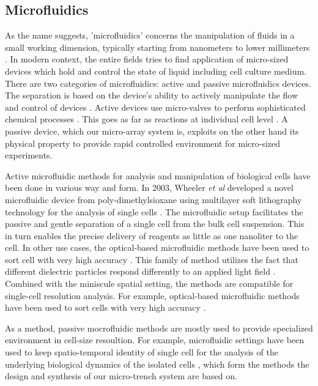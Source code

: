 \documentclass[pdftex,12pt,a4paper]{report}
\begin{document}
\subsection{Microfluidics}

As the name suggests, 'microfluidics' concerns the manipulation of fluids in a small working dimension, typically starting from nanometers to lower millimeters \cite{whitesides2006origins}. In modern context, the entire fields tries to find application of micro-sized devices which hold and control the state of liquid \cite{whitesides2006origins} including cell culture medium. There are two categories of microfluidics: active and passive microfluidics devices. The separation is based on the device's ability to actively manipulate the flow and control of devices \cite{sekhavati2015dynamic}. Active devices use micro-valves to perform sophisticated chemical processes \cite{marsden1993interdisciplinary}. This goes as far as reactions at individual cell level \cite{eyer2012microchamber}. A passive device, which our micro-array system is, exploits on the other hand its physical property to provide rapid controlled environment for micro-sized experiments.

Active microfluidic methods for analysis and manipulation of biological cells have been done in various way and form. In 2003, Wheeler \textit{et al} developed a novel microfluidic device from poly-dimethylsioxane using multilayer soft lithography technology for the analysis of single cells \cite{wheeler2003microfluidic}. The microfluidic setup facilitates the passive and gentle separation of a single cell from the bulk cell suspension. This in turn enables the precise delivery of reagents as little as one nanoliter to the cell. In other use cases, the optical-based microfluidic methods have been used to sort cell with very high accuracy \cite{macdonald2003microfluidic}. This family of method utilizes the fact that different dielectric particles respond differently to an applied light field \cite{tatarkova2003brownian}. Combined with the miniscule spatial setting, the methods are compatible for single-cell resolution analysis. For example, optical-based microfluidic methods have been used to sort cells with very high accuracy \cite{macdonald2003microfluidic, wang2005microfluidic, baret2009fluorescence}.

As a method, passive mocrofluidic methods are mostly used to provide specialized environment in cell-size resoultion. For example, microfluidic settings have been used to keep spatio-temporal identity of single cell for the analysis of the underlying biological dynamics of the isolated cells \cite{mu2013microfluidics, sekhavati2015marker}, which form the methods the design and synthesis of our micro-trench system are based on.
\end{document}
